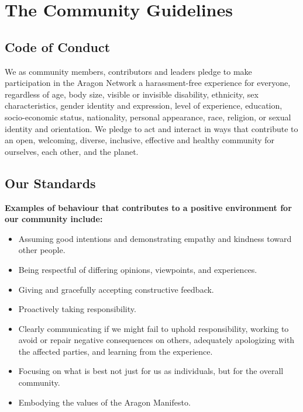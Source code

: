 
\chapter{The Community Guidelines}
\label{chap:CommunityGuidelines}
\restartnumbering


\section{Code of Conduct}
\label{sec:CodeOfConduct}

We as community members, contributors and leaders pledge to make participation in the Aragon Network a harassment-free experience for everyone, regardless of age, body size, visible or invisible disability, ethnicity, sex characteristics, gender identity and expression, level of experience, education, socio-economic status, nationality, personal appearance, race, religion, or sexual identity and orientation.
We pledge to act and interact in ways that contribute to an open, welcoming, diverse, inclusive, effective and healthy community for ourselves, each other, and the planet.


\section{Our Standards}
\label{sec:OurStandards}

\textbf{Examples of behaviour that contributes to a positive environment for our community include:}
\begin{itemize}
	\item Assuming good intentions and demonstrating empathy and kindness toward other people. 
	\item Being respectful of differing opinions, viewpoints, and experiences.
	\item Giving and gracefully accepting constructive feedback.
	\item Proactively taking responsibility.
	\item Clearly communicating if we might fail to uphold responsibility, working to avoid or repair negative consequences on others, adequately apologizing with the affected parties, and learning from the experience.
	\item Focusing on what is best not just for us as individuals, but for the overall community.
	\item Embodying the values of the Aragon Manifesto.
\end{itemize}
	
